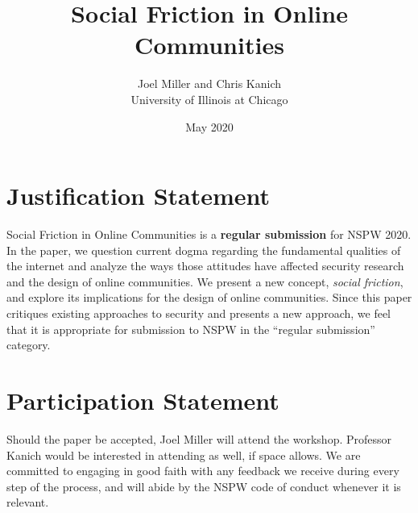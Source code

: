 \documentclass{article}
\title{Social Friction in Online Communities}
\author{Joel Miller and Chris Kanich\\University of Illinois at Chicago}
\date{May 2020}
\begin{document}
\maketitle

\section{Justification Statement}


Social Friction in Online Communities is a \textbf{regular submission} for NSPW 2020. In the paper, we question current dogma regarding the fundamental qualities of the internet and analyze the ways those attitudes have affected security research and the design of online communities. We present a new concept, \textit{social friction}, and explore its implications for the design of online communities. Since this paper critiques existing approaches to security and presents a new approach, we feel that it is  appropriate for submission to NSPW in the ``regular submission'' category.

\section{Participation Statement}

Should the paper be accepted, Joel Miller will attend the workshop. Professor Kanich would be interested in attending as well, if space allows. We are committed to engaging in good faith with any feedback we receive during every step of the process, and will abide by the NSPW code of conduct whenever it is relevant.

\thispagestyle{empty}
\end{document}
